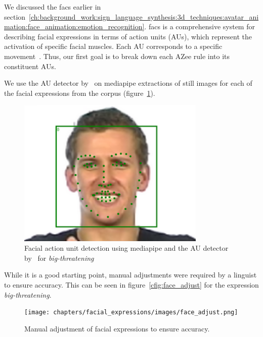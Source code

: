 \documentclass[../../main]{subfiles}
\begin{document}
We discussed the \gls{facs} earlier in section~\ref{ch:background_work:sign_language_synthesis:3d_techniques:avatar_animation:face_animation:emotion_recognition}. \gls{facs} is a comprehensive system for describing facial expressions in terms of action units (AUs), which represent the activation of specific facial muscles. Each AU corresponds to a specific movement~. Thus, our first goal is to break down each AZee rule into its constituent AUs. 

We use the AU detector by~\cite{luo2022learning} on mediapipe extractions of still images for each of the facial expressions from the corpus (figure~\ref{ch:facial_expressions:fig:face_detect}).

\begin{figure}
    \centering
    \includegraphics[width=0.8\textwidth]{chapters/facial_expressions/images/face_detect.png}
    \caption{Facial action unit detection using mediapipe and the AU detector by~\cite{luo2022learning} for \emph{big-threatening}}
    \label{ch:facial_expressions:fig:face_detect}
\end{figure}

While it is a good starting point, manual adjustments were required by a linguist to ensure accuracy. This can be seen in figure~\ref{cfig:face_adjust} for the expression \emph{big-threatening}.

\begin{figure}
    \centering
    \texttt{[image: chapters/facial\_expressions/images/face\_adjust.png]}
    \caption{Manual adjustment of facial expressions to ensure accuracy.}
    \label{ch:facial_expressions:fig:face_adjust}
\end{figure}
\end{document}
